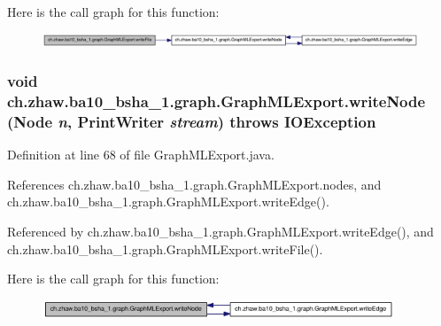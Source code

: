 Here is the call graph for this function:\nopagebreak
\begin{figure}[H]
\begin{center}
\leavevmode
\includegraphics[width=420pt]{classch_1_1zhaw_1_1ba10__bsha__1_1_1graph_1_1GraphMLExport_a5ca63fefbff43c1591da29d3529144cb_cgraph}
\end{center}
\end{figure}
\hypertarget{classch_1_1zhaw_1_1ba10__bsha__1_1_1graph_1_1GraphMLExport_a5a853fe3b7dd0a477a6805b74768bb5e}{
\subsubsection[{writeNode}]{\setlength{\rightskip}{0pt plus 5cm}void ch.zhaw.ba10\_\-bsha\_\-1.graph.GraphMLExport.writeNode ({\bf Node} {\em n}, \/  PrintWriter {\em stream})  throws IOException }}
\label{classch_1_1zhaw_1_1ba10__bsha__1_1_1graph_1_1GraphMLExport_a5a853fe3b7dd0a477a6805b74768bb5e}


Definition at line 68 of file GraphMLExport.java.

References ch.zhaw.ba10\_\-bsha\_\-1.graph.GraphMLExport.nodes, and ch.zhaw.ba10\_\-bsha\_\-1.graph.GraphMLExport.writeEdge().

Referenced by ch.zhaw.ba10\_\-bsha\_\-1.graph.GraphMLExport.writeEdge(), and ch.zhaw.ba10\_\-bsha\_\-1.graph.GraphMLExport.writeFile().

Here is the call graph for this function:\nopagebreak
\begin{figure}[H]
\begin{center}
\leavevmode
\includegraphics[width=298pt]{classch_1_1zhaw_1_1ba10__bsha__1_1_1graph_1_1GraphMLExport_a5a853fe3b7dd0a477a6805b74768bb5e_cgraph}
\end{center}
\end{figure}


